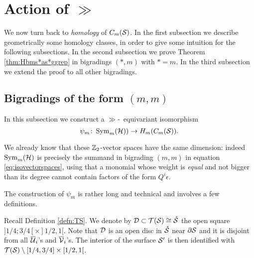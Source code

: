 \section{Action of $\gg$}
\label{sec:Actiongg}
We now turn back to \emph{homology} of $\cms$. In the first subsection we describe geometrically some
homology classes, in order to give some intuition for the following subsections.
In the second subsection we prove Theorem
\ref{thm:Hbms*as*ggrep} in bigradings $(*,m)$ with $*=m$.
In the third subsection we extend the proof to all other bigradings.



\subsection{Bigradings of the form $(m,m)$}
In this subsection we construct a $\gg$-~equivariant isomorphism 
\[
\psi_m\colon \Sym_m(\H))\to H_m(\cms).
\]

We already know that these $\Z_2$-vector spaces have the same dimension:
indeed $\Sym_m(\H)$ is precisely the summand in bigrading $(m,m)$ in equation
\eqref{eq:isovectorspaces}, using that a monomial
 whose
weight is \emph{equal} and not bigger than its degree cannot contain factors of the form
$Q^i\epsilon$.
% 


The construction of $\psi_m$ is rather long and technical and involves a few definitions.

\begin{defn}
\label{defn:DinTS} 
Recall Definition \ref{defn:TS}. We denote by $\D\subset\T(\S)\cong\mrS$ the open square $]1/4;3/4[\times]1/2,1[$.
Note that $\D$ is an open disc in $\mrS$ near $\partial\S$ and 
it is disjoint from all $\overline{\U}_i$'s and $\overline{\V}_i$'s. The interior of the surface $\S'$
is then identified with $\T(\S)\setminus [1/4,3/4]\times[1/2,1[$.
\end{defn}


